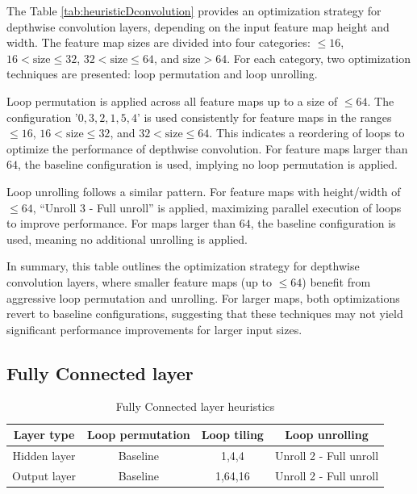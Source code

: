 The Table \ref{tab:heuristicDconvolution} provides an optimization strategy for depthwise convolution layers, depending on the input feature map height and width. The feature map sizes are divided into four categories: \( \leq 16 \), \( 16 < \text{size} \leq 32 \), \( 32 < \text{size} \leq 64 \), and \( \text{size} > 64 \). For each category, two optimization techniques are presented: loop permutation and loop unrolling.

Loop permutation is applied across all feature maps up to a size of \( \leq 64 \). The configuration '\( 0,3,2,1,5,4 \)' is used consistently for feature maps in the ranges \( \leq 16 \), \( 16 < \text{size} \leq 32 \), and \( 32 < \text{size} \leq 64 \). This indicates a reordering of loops to optimize the performance of depthwise convolution. For feature maps larger than \( 64 \), the baseline configuration is used, implying no loop permutation is applied.

Loop unrolling follows a similar pattern. For feature maps with height/width of \( \leq 64 \), ``Unroll 3 - Full unroll'' is applied, maximizing parallel execution of loops to improve performance. For maps larger than \( 64 \), the baseline configuration is used, meaning no additional unrolling is applied.

In summary, this table outlines the optimization strategy for depthwise convolution layers, where smaller feature maps (up to \( \leq 64 \)) benefit from aggressive loop permutation and unrolling. For larger maps, both optimizations revert to baseline configurations, suggesting that these techniques may not yield significant performance improvements for larger input sizes.


\subsection{Fully Connected layer}

\begin{table}[H]
\centering
\caption{Fully Connected layer heuristics}
\label{tab:heuristicFC}
\begin{tabular}{|c|c|c|c|}
\hline
\textbf{Layer type} & \textbf{Loop permutation} & \textbf{Loop tiling} & \textbf{Loop unrolling} \\ \hline
Hidden layer & Baseline & 1,4,4 & Unroll 2 - Full unroll \\ \hline
Output layer & Baseline & 1,64,16 & Unroll 2 - Full unroll \\ \hline

\end{tabular}
\end{table}

